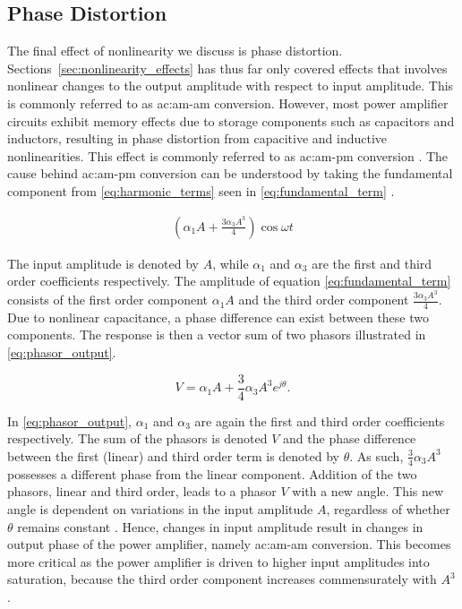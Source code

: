 \subsection{Phase Distortion}\label{sec:phase_distortion}

The final effect of nonlinearity we discuss is phase distortion. Sections~\ref{sec:nonlinearity_effects} has thus far only covered effects that involves nonlinear changes to the output amplitude with respect to input amplitude. This is commonly referred to as \gls{ac:am-am} conversion. However, most power amplifier circuits exhibit memory effects due to storage components such as capacitors and inductors, resulting in phase distortion from capacitive and inductive nonlinearities. This effect is commonly referred to as \gls{ac:am-pm} conversion \cite{miehle}. The cause behind \gls{ac:am-pm} conversion can be understood by taking the fundamental component from \eqref{eq:harmonic_terms} seen in \eqref{eq:fundamental_term} \cite{maas}.

\begin{align}
  \left(\alpha_1 A + \frac{3\alpha_3 A^3}{4}\right)\cos\omega t
  \label{eq:fundamental_term}
\end{align}

The input amplitude is denoted by $A$, while $\alpha_1$ and $\alpha_3$ are the first and third order coefficients respectively. The amplitude of equation \eqref{eq:fundamental_term} consists of the first order component $\alpha_1 A$ and the third order component $\frac{3\alpha_3 A^3}{4}$. Due to nonlinear capacitance, a phase difference can exist between these two components. The response is then a vector sum of two phasors illustrated in \eqref{eq:phasor_output}.

\begin{equation}
  V = \alpha_1 A + \frac{3}{4} \alpha_3 A^3 e^{j\theta} .
  \label{eq:phasor_output}
\end{equation}

In \eqref{eq:phasor_output}, $\alpha_1$ and $\alpha_3$ are again the first and third order coefficients respectively. The sum of the phasors is denoted $V$ and the phase difference between the first (linear) and third order term is denoted by $\theta$. As such, $\frac{3}{4} \alpha_3 A^3$ possesses a different phase from the linear component. Addition of the two phasors, linear and third order, leads to a phasor $V$ with a new angle. This new angle is dependent on variations in the input amplitude $A$, regardless of whether $\theta$ remains constant \cite{maas}. Hence, changes in input amplitude result in changes in output phase of the power amplifier, namely \gls{ac:am-am} conversion. This becomes more critical as the power amplifier is driven to higher input amplitudes into saturation, because the third order component increases commensurately with $A^3$.

